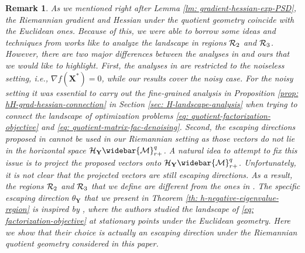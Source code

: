 \documentclass[11pt]{article}
\newtheorem{Remark}{Remark}
\newcommand{\cH}{\mathcal{H}}
\newcommand{\0}{{\mathbf{0}}}
\newcommand{\1}{{\mathbf{1}}}
\newcommand{\X}{{\mathbf{X}}}
\newcommand{\Y}{{\mathbf{Y}}}
\newcommand{\cR}{{\cal R}}
\newcommand{\cM}{{\cal M}}
\begin{document}
{
\begin{Remark} 
	As we mentioned right after Lemma \ref{lm: gradient-hessian-exp-PSD}, the Riemannian gradient and Hessian under the quotient geometry coincide with the Euclidean ones.  Because of this, we were able to borrow some ideas and techniques from works like \cite{li2016symmetry,zhu2017global} to analyze the landscape in regions $\cR_2$ and $\cR_3$. However, there are two major differences between the analyses in \cite{li2016symmetry,zhu2017global} and ours that we would like to highlight. First, the analyses in \cite{li2016symmetry,zhu2017global} are restricted to the noiseless setting, i.e., $\nabla f(\X^*) = 0$, while our results cover the noisy case. For the noisy setting it was essential to carry out the fine-grained analysis in Proposition \ref{prop: hH-grad-hessian-connection} in Section \ref{sec: H-landscape-analysis} when trying to connect the landscape of optimization problems \eqref{eq: quotient-factorization-objective} and \eqref{eq: quotient-matrix-fac-denoising}. Second, the escaping directions proposed in \cite{li2016symmetry,zhu2017global} cannot be used in our Riemannian setting as those vectors do not lie in the horizontal space $\cH_{\Y} \widebar{\cM}_{r+}^{q}$. A natural idea to attempt to fix this issue is to project the proposed vectors onto $\cH_{\Y} \widebar{\cM}_{r+}^{q}$. Unfortunately, it is not clear that the projected vectors are still escaping directions. As a result, the regions $\cR_2$ and $\cR_3$ that we define are different from the ones in \cite{li2016symmetry,zhu2017global}. The specific escaping direction $\theta_\Y$ that we present in Theorem \ref{th: h-negative-eigenvalue-region} is inspired by \cite{ge2017no}, where the authors studied the landscape of \eqref{eq: factorization-objective} at stationary points under the Euclidean geometry. Here we show that their choice is actually an escaping direction under the Riemannian quotient geometry considered in this paper.  
\end{Remark}
}
\end{document}
